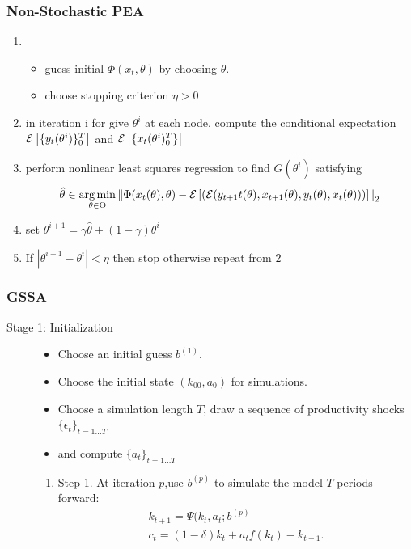 \documentclass[tikz]{beamer}
\begin{document}
 \begin{frame}
  \frametitle{Non-Stochastic PEA}


    \begin{enumerate}
    \item \ 
      \begin{itemize}
      \item guess initial $\Phi(x_t,\theta)$ by choosing $\theta$. 
      \item choose stopping criterion $\eta>0$
      \end{itemize}
    \item in iteration i for give $\theta^i$ at each node, compute the conditional expectation
${\mathcal{E}\left [ \{y_t(\theta^i)\}^T_0 \right ]}$ and ${\mathcal{E}\left [ \{x_t(\theta^i)^T_0\} \right ]}$
\item perform nonlinear least squares regression to find $G(\theta^i)$ satisfying 
  \begin{gather}
    \hat{\theta} \in \operatorname*{arg\,min}_{\theta \in \Theta} \left\lVert\Phi(x_t(\theta),\theta)- {\mathcal{E}\left [ (\mathcal{E}(y_{t+1}t(\theta),x_{t+1}(\theta),y_t(\theta),x_t(\theta))) \right ]} \right\rVert_2
  \end{gather}
\item set $\theta^{i+1} = \gamma \hat{\theta} + (1-\gamma)\theta^i$
\item If $|\theta^{i+1} - \theta^i| < \eta$ then stop otherwise repeat from 2
    \end{enumerate}


 \end{frame}

 \begin{frame}
   \frametitle{GSSA}

\cite{juddGSSA2011}
 \begin{description}
\item[Stage 1: Initialization]
  \begin{itemize}
  \item  Choose an initial guess $b^{(1)}$.
 \item Choose the initial state $(k_00,a_0)$ for simulations. 
 \item  Choose a simulation length $T$, draw a sequence of 
  productivity shocks $\{\epsilon_t \}_{t=1\ldots T}$
  \item and compute $\{a_t \}_{t =1\ldots T}$
   \end{itemize}
   \begin{enumerate}
   \item 
 Step 1. At iteration $p$,use $b^(p)$ to simulate the model $T$ periods forward:
 \begin{gather}
 k_{t+1} = \Psi(k_t,a_t;b^{(p)}\\
 c_t = (1 − δ)k_t + a_tf(k_t) − k_{t+1}. 
 \end{gather}

   \end{enumerate}
 \end{description}

 \end{frame}
\end{document}
